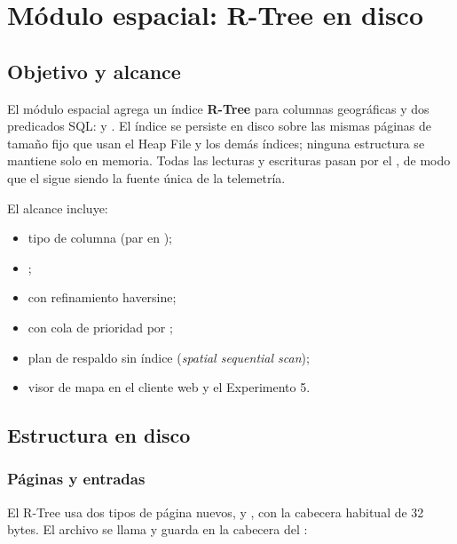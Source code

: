 \section{Módulo espacial: R-Tree en disco}
\label{sec:espacial}



\subsection{Objetivo y alcance}

El módulo espacial agrega un índice \textbf{R-Tree} para columnas geográficas y dos
predicados SQL:  y . El índice se persiste en disco
sobre las mismas páginas de tamaño fijo que usan el Heap File y los demás índices;
ninguna estructura se mantiene solo en memoria. Todas las lecturas y escrituras
pasan por el , de modo que el  sigue siendo la fuente
única de la telemetría.

El alcance incluye:

\begin{itemize}
  \item tipo de columna  (par  en );
  \item {};
  \item {} con refinamiento haversine;
  \item {} con cola de prioridad por ;
  \item plan de respaldo sin índice (\emph{spatial sequential scan});
  \item visor de mapa en el cliente web y el Experimento 5.
\end{itemize}

\subsection{Estructura en disco}

\subsubsection{Páginas y entradas}

El R-Tree usa dos tipos de página nuevos,  y
, con la cabecera habitual de 32 bytes. El archivo se llama
 y guarda en la cabecera del :

